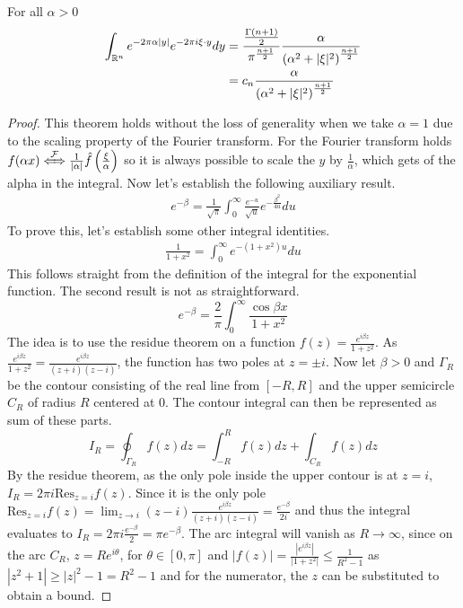 \begin{theorem}\label{thm:poisson-kernel}
    For all $\alpha>0$ 
    \begin{align*}
        \int_{\mathbb R^{n}}e^{-2\pi\alpha|y|}e^{-2\pi i \xi\cdot y}dy &= \frac{\frac{\Gamma\left(n+1\right)}{2}}{\pi^{\frac{n+1}{2}}}\frac{\alpha}{{(\alpha^2+|\xi|^2)}^{\frac{n+1}{2}}} \\
        &=c_n\frac{\alpha}{{(\alpha^2+|\xi|^2)}^{\frac{n+1}{2}}}
    \end{align*}
\end{theorem}
\begin{proof}
    This theorem holds without the loss of generality when we take $\alpha=1$ due to the scaling property of the Fourier transform. For the Fourier transform holds $f(\alpha x)\xLeftrightarrow{\mathcal{F}}\frac{1}{|\alpha|}\hat{f}\left(\frac{\xi}{\alpha}\right)$ so it is always possible to scale the $y$ by $\frac{1}{\alpha}$, which gets of the alpha in the integral. Now let's establish the following auxiliary result.
    \begin{gather}\label{eq:poisson-kernel1}
        e^{-\beta}=\frac{1}{\sqrt{\pi}}\int_0^\infty \frac{e^{-u}}{\sqrt{u}}e^{-\frac{\beta^2}{4u}}du
    \end{gather}
    To prove this, let's establish some other integral identities.
    \begin{gather*}
        \frac{1}{1+x^2}=\int_0^\infty e^{-(1+x^2)u}du
    \end{gather*}
    This follows straight from the definition of the integral for the exponential function. The second result is not as straightforward. 
    \begin{equation*}
        e^{-\beta}=\frac{2}{\pi}\int_0^\infty\frac{\cos{\beta x}}{1+x^2}
    \end{equation*}
    The idea is to use the residue theorem on a function $f(z)=\frac{e^{i\beta z}}{1+z^2}$. As $\frac{e^{i\beta z}}{1+z^2}=\frac{e^{i\beta z}}{(z+i)(z-i)}$, the function has two poles at $z=\pm i$. Now let $\beta>0$ and $\Gamma_R$ be the contour consisting of the real line from $[-R,R]$ and the upper semicircle $C_R$ of radius $R$ centered at $0$. The contour integral can then be represented as sum of these parts.
    \begin{equation*}
        I_R=\oint_{\Gamma_R}f(z)dz=\int_{-R}^Rf(z)dz+\int_{C_R}f(z)dz
    \end{equation*}
    By the residue theorem, as the only pole inside the upper contour is at $z=i$, $I_R=2\pi i\text{Res}_{z=i}f(z)$. Since it is the only pole $\text{Res}_{z=i}f(z)=\lim_{z\rightarrow i}(z-i)\frac{e^{i\beta z}}{(z+i)(z-i)}=\frac{e^{-\beta}}{2i}$ and thus the integral evaluates to $I_R=2\pi i \frac{e^{-\beta}}{2}=\pi e^{-\beta}$. The arc integral will vanish as $R\rightarrow\infty$, since on the arc $C_R$, $z=Re^{i\theta}$, for $\theta\in[0,\pi]$ and $|f(z)|=\frac{|e^{i\beta z}|}{|1+z^2|}\leq\frac{1}{R^2-1}$ as $|z^2+1|\geq|z|^2-1=R^2-1$ and for the numerator, the $z$ can be substituted to obtain a bound.

\end{proof}
